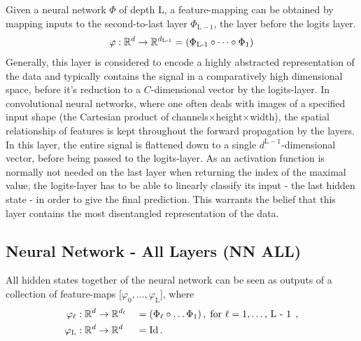 Given a neural network $\Phi$ of depth L,
a feature-mapping can be obtained by mapping inputs to the second-to-last layer $\Phi_{\text{L}-1}$, 
the layer before the logits layer.
\[
    \varphi : \mathbb{R}^d \to \mathbb{R}^{d_\textnormal{L-1}} = (\Phi_\textnormal{L-1} \circ \dots \circ \Phi_1)
\]
Generally, this layer is considered to encode a highly abstracted representation of the data
and typically contains the signal in a comparatively high dimensional space, before it's
reduction to a $C$-dimensional vector by the logits-layer.
In convolutional neural networks, where one often deals with images
of a specified input shape (the Cartesian product of channels$\times$height$\times$width), 
the spatial relationship of features is kept throughout the forward propagation by the layers.
In this layer, the entire signal is flattened down to a single $d^{\text{L}-1}$-dimensional vector, 
before being passed to the logits-layer.
As an activation function is normally not needed on the last layer when returning the index of the maximal value, 
the logits-layer has to be able to linearly classify its input - the last hidden state - in order to 
give the final prediction.
This warrants the belief that this layer contains the most disentangled representation of the data.


\subsection{Neural Network - All Layers (NN ALL)}

All hidden states together of the neural network can be seen as outputs of a collection of feature-maps [$\varphi_0, \dots, \varphi_\text{L}$], where
\begin{alignat*}{2}
    \varphi_\ell &: \mathbb{R}^d \to \mathbb{R}^{d_\ell} &&= (\Phi_\ell \circ \dots \Phi_1)
    \,, \; \text{for $\ell = 1, \dots$, L - 1} \;  \,, \\
    \varphi_\textnormal{L} &: \mathbb{R}^d \to \mathbb{R}^d &&= \textnormal{Id} \,.
\end{alignat*}





